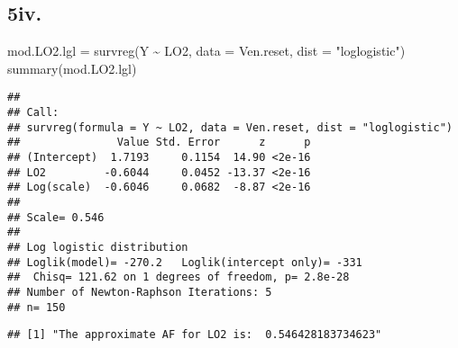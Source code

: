 \documentclass[
]{article}
\newenvironment{Shaded}{\begin{snugshade}}{\end{snugshade}}
\newcommand{\AttributeTok}[1]{\textcolor[rgb]{0.77,0.63,0.00}{#1}}
\newcommand{\CommentTok}[1]{\textcolor[rgb]{0.56,0.35,0.01}{\textit{#1}}}
\newcommand{\DecValTok}[1]{\textcolor[rgb]{0.00,0.00,0.81}{#1}}
\newcommand{\FloatTok}[1]{\textcolor[rgb]{0.00,0.00,0.81}{#1}}
\newcommand{\FunctionTok}[1]{\textcolor[rgb]{0.00,0.00,0.00}{#1}}
\newcommand{\NormalTok}[1]{#1}
\newcommand{\OtherTok}[1]{\textcolor[rgb]{0.56,0.35,0.01}{#1}}
\newcommand{\SpecialCharTok}[1]{\textcolor[rgb]{0.00,0.00,0.00}{#1}}
\newcommand{\StringTok}[1]{\textcolor[rgb]{0.31,0.60,0.02}{#1}}
\begin{document}
\hypertarget{iv.-1}{%
\subsection{5iv.}\label{iv.-1}}

\begin{Shaded}
\begin{Highlighting}[]
\NormalTok{mod.LO2.lgl }\OtherTok{=} \FunctionTok{survreg}\NormalTok{(Y }\SpecialCharTok{\textasciitilde{}}\NormalTok{ LO2, }\AttributeTok{data =}\NormalTok{ Ven.reset, }\AttributeTok{dist =} \StringTok{"loglogistic"}\NormalTok{)}
\FunctionTok{summary}\NormalTok{(mod.LO2.lgl)}
\end{Highlighting}
\end{Shaded}

\begin{verbatim}
## 
## Call:
## survreg(formula = Y ~ LO2, data = Ven.reset, dist = "loglogistic")
##               Value Std. Error      z      p
## (Intercept)  1.7193     0.1154  14.90 <2e-16
## LO2         -0.6044     0.0452 -13.37 <2e-16
## Log(scale)  -0.6046     0.0682  -8.87 <2e-16
## 
## Scale= 0.546 
## 
## Log logistic distribution
## Loglik(model)= -270.2   Loglik(intercept only)= -331
##  Chisq= 121.62 on 1 degrees of freedom, p= 2.8e-28 
## Number of Newton-Raphson Iterations: 5 
## n= 150
\end{verbatim}

\begin{Shaded}
\end{Shaded}

\begin{verbatim}
## [1] "The approximate AF for LO2 is:  0.546428183734623"
\end{verbatim}
\end{document}
